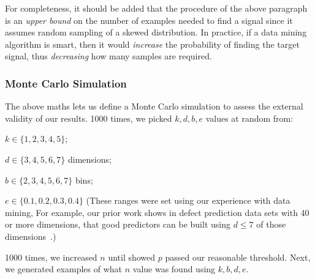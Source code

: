 For completeness, it should be added  that the procedure of the above paragraph is an {\em upper bound} on the
number of examples needed to find a signal since it
assumes random sampling of a skewed distribution. In
practice, if a data mining algorithm is smart, then
it would {\em increase} the probability of finding
the target signal, thus {\em decreasing} how many samples are required.

\subsubsection{Monte Carlo Simulation}
    The above maths lets us define
    a  Monte Carlo simulation to assess the external validity of our results.
    1000 times, we picked $k,d,b,e$ values at random from:
    \bi
      \item $k \in \{1,2,3,4,5\}$;
  \item $d \in \{3,4,5,6,7\}$ dimensions;
  \item $b \in \{2,3,4,5,6,7\}$ bins; 
    \item $e\in \{0.1,0.2,0.3,0.4\}$
      \ei
      (These ranges were set using our experience with data mining, For example, our prior work shows in defect prediction data sets
      with 40 or more dimensions, that good predictors can be built using $d\le 7$ of those dimensions~\cite{Menzies07}.)
      
     1000 times,
     we increased $n$ until  showed  $p$ passed our reasonable threshold.
     Next, we generated examples of what $n$ value was found using  $k,b,d,e$.
     

